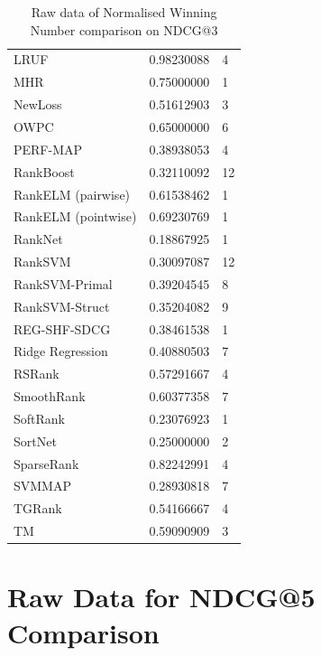 \documentclass{sig-alternate-2013}
\begin{document}
\begin{table}
\begin{tabular}{l|l|l}
LRUF & 0.98230088 & 4 \\ 
MHR & 0.75000000 & 1 \\ 
NewLoss & 0.51612903 & 3 \\ 
OWPC & 0.65000000 & 6 \\ 
PERF-MAP & 0.38938053 & 4 \\ 
RankBoost & 0.32110092 & 12 \\ 
RankELM (pairwise) & 0.61538462 & 1 \\ 
RankELM (pointwise) & 0.69230769 & 1 \\ 
RankNet & 0.18867925 & 1 \\ 
RankSVM & 0.30097087 & 12 \\ 
RankSVM-Primal & 0.39204545 & 8 \\ 
RankSVM-Struct & 0.35204082 & 9 \\ 
REG-SHF-SDCG & 0.38461538 & 1 \\ 
Ridge Regression & 0.40880503 & 7 \\ 
RSRank & 0.57291667 & 4 \\ 
SmoothRank & 0.60377358 & 7 \\ 
SoftRank & 0.23076923 & 1 \\ 
SortNet & 0.25000000 & 2 \\ 
SparseRank & 0.82242991 & 4 \\ 
SVMMAP & 0.28930818 & 7 \\ 
TGRank & 0.54166667 & 4 \\ 
TM & 0.59090909 & 3 \\
\end{tabular}
\caption{Raw data of Normalised Winning Number comparison on NDCG@3}
\label{tab:raw_data_norm_winnum_NDCG3}
\end{table}

\section{Raw Data for NDCG@5 Comparison}
\label{app:norm_winnum_NDCG5}
\end{document}
